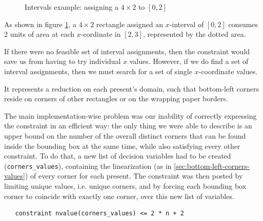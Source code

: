 \documentclass[a4paper,10pt]{article}
\newcounter{subsubsubsection}[subsubsection]
\begin{document}
\begin{figure}[h]
   \centering
   \caption{Intervals example: assigning a $4\times2$ to $[0,2]$}
   \label{fig:intervals}
\end{figure}

As shown in figure \ref{fig:intervals}, a $4\times2$ rectangle assigned an $x$-interval of $[0,2]$ consumes 2 units of area at each $x$-cordinate in $[2,3]$, represented by the dotted area.

If there were no feasible set of interval assignments, then the constraint would save us from having to try individual $x$ values. However, if we do find a set of interval assignments, then we must search for a set of single $x$-coordinate values.

 \label{sec:anchor-points-v1}
It represents a reduction on each present's domain, such that bottom-left corners reside on corners of other rectangles or on the wrapping paper borders.

The main implementation-wise problem was our inability of correctly expressing the constraint in an efficient way: the only thing we were able to describe is an upper bound on the number of the overall distinct corners that can be found inside the bounding box at the same time, while also satisfying every other constraint.
To do that, a new list of decision variables had to be created (\texttt{corners\_values}), containing the linearization (as in \ref{sec:bottom-left-corners-values}) of every corner for each present. 
The constraint was then posted by limiting unique values, i.e. unique corners, and by forcing each bounding box corner to coincide with exactly one corner, over this new list of variables.

\begin{verbatim}
   constraint nvalue(corners_values) <= 2 * n + 2
\end{verbatim}
\end{document}
